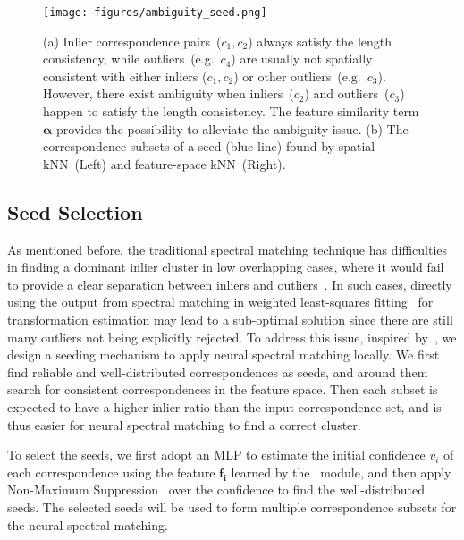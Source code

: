 \begin{figure}[tb]
\setlength{\abovecaptionskip}{0.2cm}
\setlength{\belowcaptionskip}{-0.35cm}
\vspace{-0.5cm}
\texttt{[image: figures/ambiguity\_seed.png]}
    \caption{(a) 
{Inlier correspondence pairs~($c_1,c_2$) always satisfy the length consistency, while outliers~(e.g.~$c_4$) {are usually not spatially consistent with} either inliers ($c_1,c_2$) or {other} outliers~(e.g.~$c_3$).
However, there exist ambiguity when inliers~($c_2$) and outliers~($c_3$) {happen to} satisfy the length consistency.}
The feature similarity term $\bm{\alpha}$ provides the possibility to alleviate {the ambiguity issue}. (b) The correspondence subsets of {a seed (blue line)}
     found by spatial kNN~(Left) and feature-space
kNN~(Right). } 
    \label{fig:ambiguity}
\end{figure}
















\subsection{Seed Selection}
\label{subsec:seed}
{As mentioned before, the traditional spectral matching {technique} has {difficulties} in finding {a} dominant inlier cluster in low overlapping cases, {where it would fail} to provide a clear separation between inliers and outliers~\cite{yang2019extreme}. {In such cases}, directly using the output from spectral matching in weighted least-squares fitting~\cite{besl1992method} for transformation estimation may lead to a sub-optimal solution since
there are still many outliers not being explicitly rejected.} 
To address this issue, inspired by~\cite{cavalli2020adalam}, we design a seeding mechanism to apply neural spectral matching locally. We first find reliable and well-distributed correspondences as seeds, {and around them search for consistent correspondences in the feature space.} Then each subset is expected to have a higher inlier ratio {than the input correspondence set}, {and is thus} easier for neural spectral matching to find {a} correct cluster.  


To select the seeds, we first adopt an MLP to estimate the initial confidence $v_i$ of each correspondence using the feature $\bm{f_i}$ learned by the \nonlocal~module,
and then apply Non-Maximum Suppression~\cite{lowe2004distinctive} over the confidence to find the well-distributed seeds.
{The selected seeds will be used to form multiple correspondence subsets for the neural spectral matching.}







